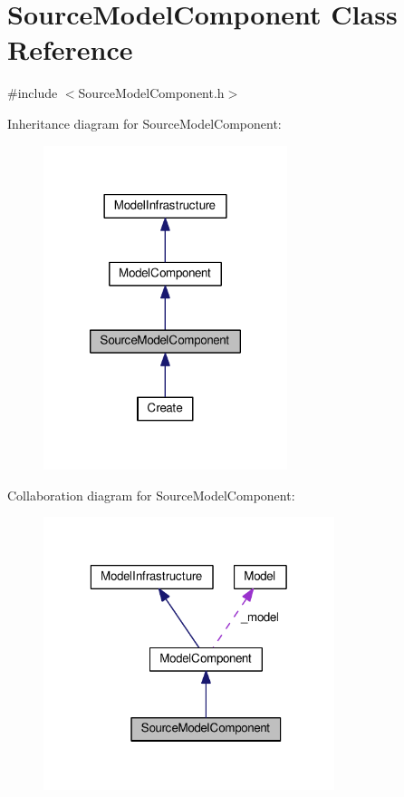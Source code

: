 \hypertarget{class_source_model_component}{\section{Source\-Model\-Component Class Reference}
\label{class_source_model_component}
}


{\ttfamily \#include $<$Source\-Model\-Component.\-h$>$}



Inheritance diagram for Source\-Model\-Component\-:\nopagebreak
\begin{figure}[H]
\begin{center}
\leavevmode
\includegraphics[width=202pt]{class_source_model_component__inherit__graph}
\end{center}
\end{figure}


Collaboration diagram for Source\-Model\-Component\-:\nopagebreak
\begin{figure}[H]
\begin{center}
\leavevmode
\includegraphics[width=241pt]{class_source_model_component__coll__graph}
\end{center}
\end{figure}
